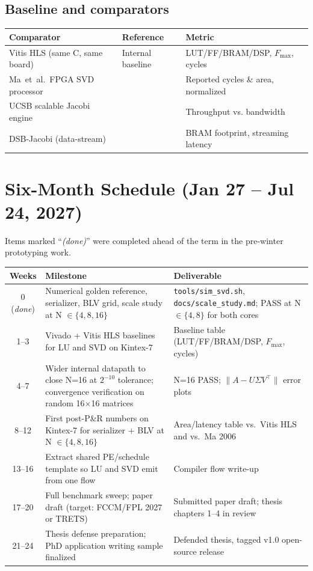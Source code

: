 \documentclass[11pt,letterpaper]{article}
\newcommand{\ttp}[1]{\texttt{\small #1}}
\begin{document}
\subsection{Baseline and comparators}

\begin{center}
\begin{tabular}{p{4.7cm} p{2.5cm} p{6.5cm}}
\toprule
\textbf{Comparator} & \textbf{Reference} & \textbf{Metric} \\
\midrule
Vitis HLS (same C, same board) & Internal baseline & LUT/FF/BRAM/DSP, $F_{\max}$, cycles \\
Ma~et~al.\ FPGA SVD processor & \cite{ma2006} & Reported cycles \& area, normalized \\
UCSB scalable Jacobi engine & \cite{liu2020} & Throughput vs. bandwidth \\
DSB-Jacobi (data-stream) & \cite{dsbjacobi2025} & BRAM footprint, streaming latency \\
\bottomrule
\end{tabular}
\end{center}

\section{Six-Month Schedule (Jan 27 -- Jul 24, 2027)}

Items marked ``\emph{(done)}'' were completed ahead of the term in the pre-winter prototyping work.

\begin{center}
\begin{tabular}{c p{7.2cm} p{6.0cm}}
\toprule
\textbf{Weeks} & \textbf{Milestone} & \textbf{Deliverable} \\
\midrule
0 (\emph{done}) & Numerical golden reference, serializer, BLV grid, scale study at N $\in \{4, 8, 16\}$ & \ttp{tools/sim\_svd.sh}, \ttp{docs/scale\_study.md}; PASS at N $\in \{4, 8\}$ for both cores \\
1--3 & Vivado + Vitis HLS baselines for LU and SVD on Kintex-7 & Baseline table (LUT/FF/BRAM/DSP, $F_{\max}$, cycles) \\
4--7 & Wider internal datapath to close N=16 at $2^{-10}$ tolerance; convergence verification on random 16$\times$16 matrices & N=16 PASS; $\|A - U\Sigma V^\top\|$ error plots \\
8--12 & First post-P\&R numbers on Kintex-7 for serializer + BLV at N $\in \{4, 8, 16\}$ & Area/latency table vs.\ Vitis HLS and vs.\ Ma 2006 \\
13--16 & Extract shared PE/schedule template so LU and SVD emit from one flow & Compiler flow write-up \\
17--20 & Full benchmark sweep; paper draft (target: FCCM/FPL 2027 or TRETS) & Submitted paper draft; thesis chapters 1--4 in review \\
21--24 & Thesis defense preparation; PhD application writing sample finalized & Defended thesis, tagged v1.0 open-source release \\
\bottomrule
\end{tabular}
\end{center}
\end{document}
